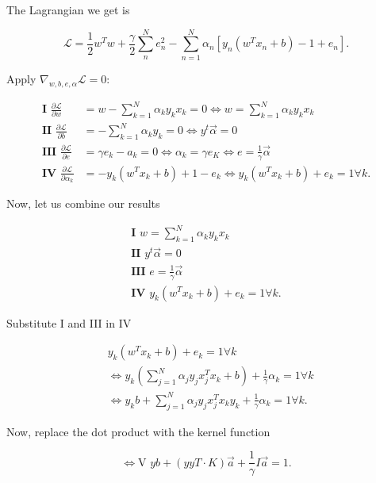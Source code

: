 The Lagrangian we get is

\[
	\mathcal{L} = \frac{1}{2} w^T w + \frac{\gamma}{2} \sum_n^N e_n^2 - \sum_{n = 1}^{N} \alpha_n [y_n (w^T x_n + b) - 1 + e_n].
\]

Apply \(\nabla_{w, b, e, \alpha} \mathcal{L} = 0\):

\begin{align*}
	\textbf{I } \frac{\partial \mathcal{L}}{\partial w}         & = w - \sum_{k = 1}^{N} \alpha_k y_k x_k = 0 \iff w = \sum_{k = 1}^{N} \alpha_k y_k x_k    \\
	\textbf{II } \frac{\partial \mathcal{L}}{\partial b}        & = - \sum_{k = 1}^{N} \alpha_k y_k = 0 \iff  y^t \vec{\alpha} = 0                          \\
	\textbf{III } \frac{\partial \mathcal{L}}{\partial e}       & = \gamma e_k - a_k  =0 \iff \alpha_k = \gamma e_K  \iff e = \frac{1}{\gamma} \vec{\alpha} \\
	\textbf{IV } \frac{\partial \mathcal{L}}{\partial \alpha_k} & = - y_k (w^T x_k + b) + 1 - e_k \iff y_k (w^T x_k + b) + e_k = 1 \forall k.
\end{align*}

Now, let us combine our results

\begin{align*}
	\textbf{I } w = \sum_{k = 1}^{N} \alpha_k y_k x_k \\
	\textbf{II }  y^t \vec{\alpha} = 0                \\
	\textbf{III }  e = \frac{1}{\gamma} \vec{\alpha}  \\
	\textbf{IV }  y_k (w^T x_k + b) + e_k = 1 \forall k.
\end{align*}

Substitute I and III in IV

\begin{align*}
	 & y_k (w^T x_k + b) + e_k = 1 \forall k                                                               \\
	 & \iff y_k (\sum_{j = 1}^{N} \alpha_j y_j x_j^T x_k + b) +  \frac{1}{\gamma} \alpha_k = 1 \forall k   \\
	 & \iff y_k b + \sum_{j = 1}^{N} \alpha_j y_j x_j^T x_k y_k +  \frac{1}{\gamma} \alpha_k = 1 \forall k.
\end{align*}

Now, replace the dot product with the kernel function

\[
	\iff \text{V } yb + (yyT \cdot K) \vec{a} + \frac{1}{\gamma} I\vec{a} = 1.
\]

